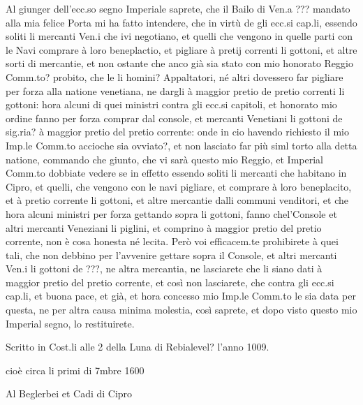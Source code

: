 Al giunger dell'ecc.so segno Imperiale  saprete, che il Bailo di Ven.a
??? mandato alla mia felice Porta  mi ha fatto intendere, che in virtù
de  gli  ecc.si cap.li,  essendo  soliti  li  mercanti Ven.i  che  ivi
negotiano, et quelli che vengono  in quelle parti con le Navi comprare
à loro beneplactio, et pigliare à pretij correnti li gottoni, et altre
sorti di  mercantie, et  non ostante  che anco già  sia stato  con mio
honorato Reggio  Comm.to? probito, che  le li homini?  Appaltatori, né
altri  dovessero far  pigliare per  forza alla  natione  venetiana, ne
dargli à maggior pretio de  pretio correnti li gottoni: hora alcuni di
quei ministri contra gli ecc.si capitoli, et honorato mio ordine fanno
per forza  comprar dal  console, et mercanti  Venetiani li  gottoni de
sig.ria? à  maggior pretio  del pretio corrente:  onde in  cio havendo
richiesto il mio Imp.le Comm.to accioche sia ovviato?, et non lasciato
far più  siml torto  alla detta natione,  commando che giunto,  che vi
sarà  questo mio  Reggio, et  Imperial Comm.to  dobbiate vedere  se in
effetto essendo soliti  li mercanti che habitano in  Cipro, et quelli,
che vengono con le navi pigliare, et comprare à loro beneplacito, et à
pretio  corrente   li  gottoni,  et  altre   mercantie  dalli  communi
venditori, et  che hora  alcuni ministri per  forza gettando  sopra li
gottoni, fanno chel'Console et altri mercanti Veneziani li piglini, et
comprino à maggior  pretio del pretio corrente, non  è cosa honesta né
lecita. Però voi efficacem.te prohibirete à quei tali, che non debbino
per l'avvenire  gettare sopra il  Console, et altri mercanti  Ven.i li
gottoni de ???, ne altra mercantia,  ne lasciarete che li siano dati à
maggior pretio del pretio corrente, et così non lasciarete, che contra
gli ecc.si cap.li, et buona pace,  et già, et hora concesso mio Imp.le
Comm.to le  sia data per questa,  ne per altra  causa minima molestia,
così   saprete,  et  dopo   visto  questo   mio  Imperial   segno,  lo
restituirete.

Scritto in Cost.li alle 2 della Luna di Rebialevel? l'anno 1009.

cioè circa li primi di 7mbre 1600



\begin{center}
Al Beglerbei et Cadi di Cipro
\end{center}

